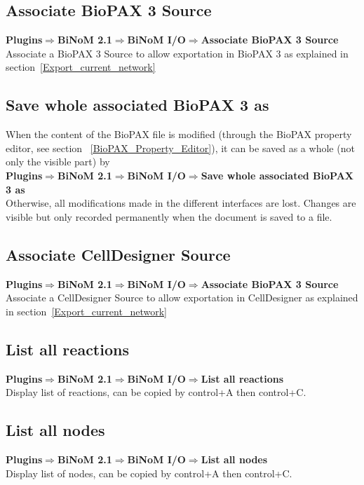\subsection{Associate BioPAX 3 Source} \label{Associate_BioPAX_Source}
\textbf{Plugins$\Rightarrow$BiNoM 2.1$\Rightarrow$BiNoM I/O$\Rightarrow$Associate BioPAX 3 Source}\\
Associate a BioPAX 3 Source to allow exportation in BioPAX 3 as explained in section~\ref{Export_current_network}

\subsection{Save whole associated BioPAX 3 as}
When the content of the BioPAX file is modified (through the BioPAX property editor, see section ~\ref{BioPAX_Property_Editor}), it can be saved as a whole (not only the visible part) by\\
\textbf{Plugins$\Rightarrow$BiNoM 2.1$\Rightarrow$BiNoM I/O$\Rightarrow$Save whole associated BioPAX 3 as}\\
Otherwise, all modifications made in the different interfaces are lost. Changes are visible but only recorded permanently when the document is saved to a file.

\subsection{Associate CellDesigner Source}\label{Associate_CellDesigner_Source}
\textbf{Plugins$\Rightarrow$BiNoM 2.1$\Rightarrow$BiNoM I/O$\Rightarrow$Associate BioPAX 3 Source} \\
Associate a CellDesigner Source to allow exportation in CellDesigner as explained in section~\ref{Export_current_network}

\subsection{List all reactions}
\textbf{Plugins$\Rightarrow$BiNoM 2.1$\Rightarrow$BiNoM I/O$\Rightarrow$List all reactions} \\
Display list of reactions, can be copied by control+A then control+C.

\subsection{List all nodes}
\textbf{Plugins$\Rightarrow$BiNoM 2.1$\Rightarrow$BiNoM I/O$\Rightarrow$List all nodes} \\
Display list of nodes, can be copied by control+A then control+C.

